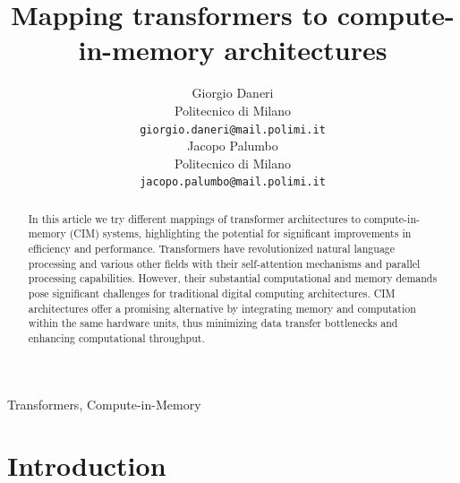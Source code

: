 \documentclass[conference]{IEEEtran}
\begin{document}
\title{Mapping transformers to compute-in-memory architectures}
\author{
 Giorgio Daneri \\
  Politecnico di Milano\\
  \texttt{giorgio.daneri@mail.polimi.it} \\

   \And
 Jacopo Palumbo \\
  Politecnico di Milano\\
  \texttt{jacopo.palumbo@mail.polimi.it} \\
}
\author{
\and
{}
}

\maketitle

\begin{abstract}
 In this article we try different mappings of transformer architectures to compute-in-memory (CIM) systems, highlighting the potential for significant improvements in efficiency and performance. Transformers have revolutionized natural language processing and various other fields with their self-attention mechanisms and parallel processing capabilities. However, their substantial computational and memory demands pose significant challenges for traditional digital computing architectures. CIM architectures offer a promising alternative by integrating memory and computation within the same hardware units, thus minimizing data transfer bottlenecks and enhancing computational throughput. 
\end{abstract}

\begin{IEEEkeywords}
Transformers, Compute-in-Memory
\end{IEEEkeywords}

\section{Introduction}
\end{document}
